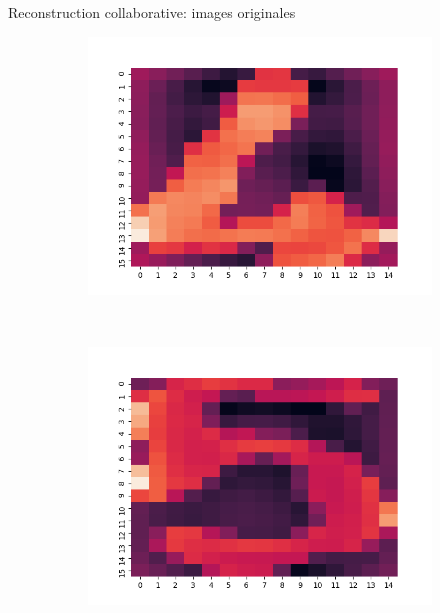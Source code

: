 \documentclass[hyperref={pdfpagelabels=false}]{beamer}
\begin{document}
\begin{frame}{Reconstruction collaborative: images originales}
\begin{figure}[h]
\begin{subfigure}[c]{0.18\textwidth}
                \includegraphics[scale=.12]{o4}
            \end{subfigure}
            \\
            \begin{subfigure}[c]{0.18\textwidth}
                \includegraphics[scale=.12]{o5}
            \end{subfigure}
            \begin{subfigure}[c]{0.18\textwidth}

\end{subfigure}
\end{figure}
\end{frame}
\end{document}
